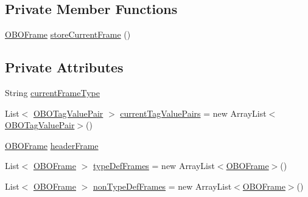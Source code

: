 \subsection*{Private Member Functions}
\begin{DoxyCompactItemize}
\item 
\hyperlink{classorg_1_1coode_1_1owlapi_1_1obo_1_1parser_1_1_o_b_o_frame}{O\-B\-O\-Frame} \hyperlink{classorg_1_1coode_1_1owlapi_1_1obo_1_1parser_1_1_raw_frame_handler_a75f2c26c7ba6e6a6fe4a096240ee98d1}{store\-Current\-Frame} ()
\end{DoxyCompactItemize}
\subsection*{Private Attributes}
\begin{DoxyCompactItemize}
\item 
String \hyperlink{classorg_1_1coode_1_1owlapi_1_1obo_1_1parser_1_1_raw_frame_handler_ae265c46bbb1fb359c2163637d841151f}{current\-Frame\-Type}
\item 
List$<$ \hyperlink{classorg_1_1coode_1_1owlapi_1_1obo_1_1parser_1_1_o_b_o_tag_value_pair}{O\-B\-O\-Tag\-Value\-Pair} $>$ \hyperlink{classorg_1_1coode_1_1owlapi_1_1obo_1_1parser_1_1_raw_frame_handler_a1338f023156bc6bfa37c3c47ca0eb25a}{current\-Tag\-Value\-Pairs} = new Array\-List$<$\hyperlink{classorg_1_1coode_1_1owlapi_1_1obo_1_1parser_1_1_o_b_o_tag_value_pair}{O\-B\-O\-Tag\-Value\-Pair}$>$()
\item 
\hyperlink{classorg_1_1coode_1_1owlapi_1_1obo_1_1parser_1_1_o_b_o_frame}{O\-B\-O\-Frame} \hyperlink{classorg_1_1coode_1_1owlapi_1_1obo_1_1parser_1_1_raw_frame_handler_a329efbd415b8d4f6f239cd4eeca419a3}{header\-Frame}
\item 
List$<$ \hyperlink{classorg_1_1coode_1_1owlapi_1_1obo_1_1parser_1_1_o_b_o_frame}{O\-B\-O\-Frame} $>$ \hyperlink{classorg_1_1coode_1_1owlapi_1_1obo_1_1parser_1_1_raw_frame_handler_a55681877c45eeec1612b467c968e3933}{type\-Def\-Frames} = new Array\-List$<$\hyperlink{classorg_1_1coode_1_1owlapi_1_1obo_1_1parser_1_1_o_b_o_frame}{O\-B\-O\-Frame}$>$()
\item 
List$<$ \hyperlink{classorg_1_1coode_1_1owlapi_1_1obo_1_1parser_1_1_o_b_o_frame}{O\-B\-O\-Frame} $>$ \hyperlink{classorg_1_1coode_1_1owlapi_1_1obo_1_1parser_1_1_raw_frame_handler_a9290fef71b85126ea834a8597ebf0875}{non\-Type\-Def\-Frames} = new Array\-List$<$\hyperlink{classorg_1_1coode_1_1owlapi_1_1obo_1_1parser_1_1_o_b_o_frame}{O\-B\-O\-Frame}$>$()
\end{DoxyCompactItemize}


